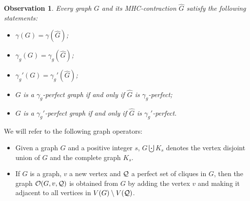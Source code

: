 \documentclass[12pt]{article}
\newtheorem{observation}[theorem]{Observation}
\newcommand{\cO}{{\cal O}}
\newcommand{\cQ}{{\cal Q}}
\begin{document}
\begin{observation}
	\label{observation}
	Every graph $G$ and its MHC-contraction $\widehat{G}$ satisfy the following statements:
	\begin{itemize}
		\item[$(i)$] $\gamma(G)=\gamma(\widehat{G})$;
		\item[$(ii)$] $\gamma_g(G)=\gamma_g(\widehat{G})$;
		\item[$(iii)$] $\gamma_g'(G)=\gamma_g'(\widehat{G})$;
		\item[$(iv)$] $G$ is a $\gamma_g$-perfect graph if and only if $\widehat{G}$ is  $\gamma_g$-perfect;
		\item[$(v)$] $G$ is a $\gamma_g'$-perfect graph if and only if $\widehat{G}$ is  $\gamma_g'$-perfect.
	\end{itemize}
\end{observation}

We will refer to the following graph operators:
\begin{itemize}
	\item Given a graph $G$ and a positive integer $s$, $G \bigcupdot K_s$ denotes the vertex disjoint union of $G$ and the complete graph $K_s$. 
   \item If $G$ is a graph, $v$ a new vertex and $\cQ$ a perfect set of cliques in $G$, then the graph $\cO(G, v, \cQ)$ is obtained from $G$ by adding the vertex $v$ and making it adjacent to all vertices in $V(G)\setminus V(\cQ)$.
\end{itemize}
\end{document}
